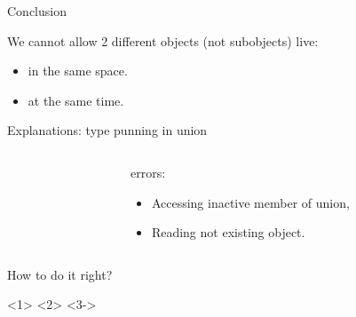 \documentclass{panicsoftware-presentation}
\makeatletter
\newenvironment{itemizeSeq}{\begin{itemize}[<+-|alert@+>]}{\end{itemize}}
\makeatother
\begin{document}
\begin{frame}{Conclusion}

We cannot allow 2 different objects (not subobjects) live:

\begin{itemize}
	\item in the same space.
	\item at the same time.
\end{itemize}

\end{frame}

\begin{frame}{Explanations: type punning in union}

\begin{columns}

\begin{column}{0.48\linewidth}
\inputminted[highlightlines={14}]{\myCpp}{examples/invalid_union_use.cpp}
\end{column}
\begin{column}{0.48\linewidth}

\centerline{\alert{errors:}}

\begin{itemizeSeq}
\item Accessing inactive member of union,
\item Reading not existing object.
\end{itemizeSeq}

\end{column}

\end{columns}


\end{frame}

\begin{frame}{How to do it right?}

<1>
<2>
<3->

\end{frame}
\end{document}
